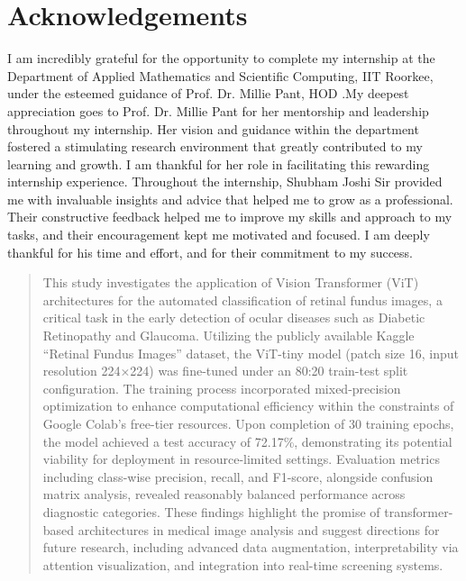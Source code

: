 \documentclass[a4paper,12pt]{report}
\begin{document}
\chapter*{Acknowledgements}
\thispagestyle{empty}

I am incredibly grateful for the opportunity to complete my internship at the Department of Applied Mathematics and Scientific Computing, IIT Roorkee, under the esteemed guidance of Prof. Dr. Millie Pant, HOD .\newline My deepest appreciation goes to Prof. Dr. Millie Pant for her mentorship and leadership throughout my internship.  Her vision and guidance within the department fostered a stimulating research environment that greatly contributed to my learning and growth. I am  thankful for her role in facilitating this rewarding internship experience.\newline \newline
Throughout the internship, Shubham Joshi Sir provided me with invaluable insights and advice that helped me to grow as a professional. Their constructive feedback helped me to improve my skills and approach to my tasks, and their encouragement kept me motivated and focused. I am deeply thankful for his time and effort, and for their commitment to my success.

\clearpage


\begin{abstract}
This study investigates the application of Vision Transformer (ViT) architectures for the automated classification of retinal fundus images, a critical task in the early detection of ocular diseases such as Diabetic Retinopathy and Glaucoma. Utilizing the publicly available Kaggle “Retinal Fundus Images” dataset, the ViT-tiny model (patch size 16, input resolution 224×224) was fine-tuned under an 80:20 train-test split configuration. The training process incorporated mixed-precision optimization to enhance computational efficiency within the constraints of Google Colab’s free-tier resources. Upon completion of 30 training epochs, the model achieved a test accuracy of 72.17\%, demonstrating its potential viability for deployment in resource-limited settings. Evaluation metrics including class-wise precision, recall, and F1-score, alongside confusion matrix analysis, revealed reasonably balanced performance across diagnostic categories. These findings highlight the promise of transformer-based architectures in medical image analysis and suggest directions for future research, including advanced data augmentation, interpretability via attention visualization, and integration into real-time screening systems.


\end{abstract}
\end{document}
